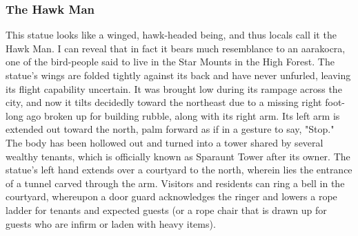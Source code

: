 \documentclass[10pt,a4paper,twoside,twocolumn,openany,nodeprecatedcode]{dndbook}
\begin{document}
\subsubsection{The Hawk Man}
This statue looks like a winged, hawk-headed being, and thus locals call it the Hawk Man. I can reveal that in fact it bears much resemblance to an aarakocra, one of the bird-people said to live in the Star Mounts in the High Forest. The statue's wings are folded tightly against its back and have never unfurled, leaving its flight capability uncertain. It was brought low during its rampage across the city, and now it tilts decidedly toward the northeast due to a missing right foot-long ago broken up for building rubble, along with its right arm. Its left arm is extended out toward the north, palm forward as if in a gesture to say, "Stop."
The body has been hollowed out and turned into a tower shared by several wealthy tenants, which is officially known as Sparaunt Tower after its owner. The statue's left hand extends over a courtyard to the north, wherein lies the entrance of a tunnel carved through the arm. Visitors and residents can ring a bell in the courtyard, whereupon a door guard acknowledges the ringer and lowers a rope ladder for tenants and expected guests (or a rope chair that is drawn up for guests who are infirm or laden with heavy items).
\end{document}
